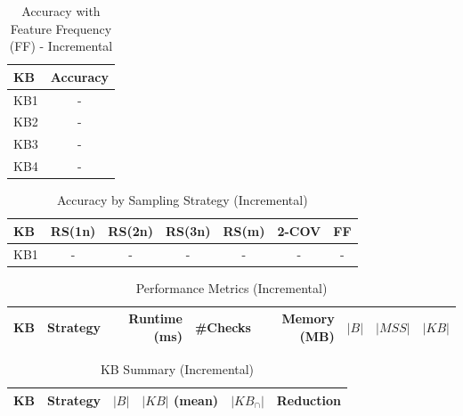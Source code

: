\begin{table}[htbp]
\centering
\caption{Accuracy with Feature Frequency (FF) - Incremental}
\label{tab:table11_incremental}
\begin{tabular}{lc}
\toprule
KB & Accuracy \\
\midrule
KB1 & - \\
KB2 & - \\
KB3 & - \\
KB4 & - \\
\bottomrule
\end{tabular}
\end{table}

\begin{table}[htbp]
\centering
\caption{Accuracy by Sampling Strategy (Incremental)}
\label{tab:accuracy_incremental}
\begin{tabular}{lcccccc}
\toprule
KB & RS(1n) & RS(2n) & RS(3n) & RS(m) & 2-COV & FF \\
\midrule
KB1 & - & - & - & - & - & - \\
\bottomrule
\end{tabular}
\end{table}

\begin{table}[htbp]
\centering
\caption{Performance Metrics (Incremental)}
\label{tab:performance_incremental}
\begin{tabular}{llrrrrrr}
\toprule
KB & Strategy & Runtime (ms) & \#Checks & Memory (MB) & $|B|$ & $|MSS|$ & $|KB|$ \\
\bottomrule
\end{tabular}
\end{table}

\begin{table}[htbp]
\centering
\caption{KB Summary (Incremental)}
\label{tab:kb_summary_incremental}
\begin{tabular}{llrrrr}
\toprule
KB & Strategy & $|B|$ & $|KB|$ (mean) & $|KB_{\cap}|$ & Reduction \\
\bottomrule
\end{tabular}
\end{table}

